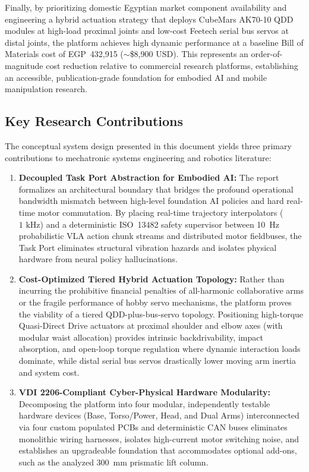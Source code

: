 Finally, by prioritizing domestic Egyptian market component availability and engineering a hybrid actuation strategy that deploys CubeMars AK70-10 QDD modules at high-load proximal joints and low-cost Feetech serial bus servos at distal joints, the platform achieves high dynamic performance at a baseline Bill of Materials cost of EGP~432,915 ($\sim$\$8,900 USD). This represents an order-of-magnitude cost reduction relative to commercial research platforms, establishing an accessible, publication-grade foundation for embodied AI and mobile manipulation research.

\subsection{Key Research Contributions}
The conceptual system design presented in this document yields three primary contributions to mechatronic systems engineering and robotics literature:
\begin{enumerate}[leftmargin=1.5em]
  \item \textbf{Decoupled Task Port Abstraction for Embodied AI:} The report formalizes an architectural boundary that bridges the profound operational bandwidth mismatch between high-level foundation AI policies and hard real-time motor commutation. By placing real-time trajectory interpolators ($1\text{ kHz}$) and a deterministic ISO~13482 safety supervisor between 10~Hz probabilistic VLA action chunk streams and distributed motor fieldbuses, the Task Port eliminates structural vibration hazards and isolates physical hardware from neural policy hallucinations.
  \item \textbf{Cost-Optimized Tiered Hybrid Actuation Topology:} Rather than incurring the prohibitive financial penalties of all-harmonic collaborative arms or the fragile performance of hobby servo mechanisms, the platform proves the viability of a tiered QDD-plus-bus-servo topology. Positioning high-torque Quasi-Direct Drive actuators at proximal shoulder and elbow axes (with modular waist allocation) provides intrinsic backdrivability, impact absorption, and open-loop torque regulation where dynamic interaction loads dominate, while distal serial bus servos drastically lower moving arm inertia and system cost.
  \item \textbf{VDI 2206-Compliant Cyber-Physical Hardware Modularity:} Decomposing the platform into four modular, independently testable hardware devices (Base, Torso/Power, Head, and Dual Arms) interconnected via four custom populated PCBs and deterministic CAN buses eliminates monolithic wiring harnesses, isolates high-current motor switching noise, and establishes an upgradeable foundation that accommodates optional add-ons, such as the analyzed 300~mm prismatic lift column.
\end{enumerate}

